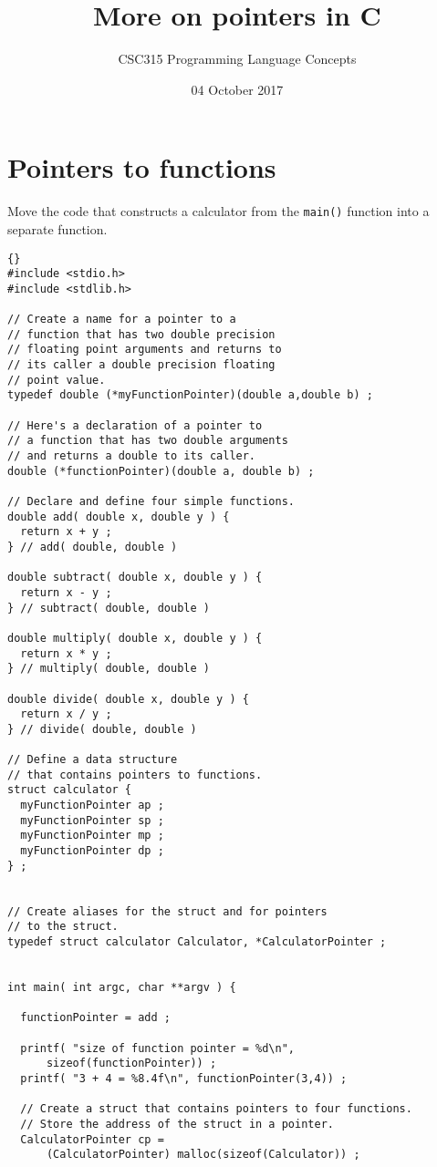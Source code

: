 \documentclass[twosides]{article}
\title{More on pointers in C}
\author{CSC315 Programming Language Concepts}
\date{04 October 2017}
\begin{document}
\maketitle

\section{Pointers to functions}

Move the code that constructs a calculator
from the \lstinline+main()+ function into
a separate function.

\begin{lstlisting}{}
#include <stdio.h>
#include <stdlib.h>

// Create a name for a pointer to a
// function that has two double precision
// floating point arguments and returns to
// its caller a double precision floating
// point value.
typedef double (*myFunctionPointer)(double a,double b) ;

// Here's a declaration of a pointer to
// a function that has two double arguments
// and returns a double to its caller.
double (*functionPointer)(double a, double b) ;

// Declare and define four simple functions.
double add( double x, double y ) {
  return x + y ;
} // add( double, double )

double subtract( double x, double y ) {
  return x - y ;
} // subtract( double, double )

double multiply( double x, double y ) {
  return x * y ;
} // multiply( double, double )

double divide( double x, double y ) {
  return x / y ;
} // divide( double, double )

// Define a data structure
// that contains pointers to functions.
struct calculator {
  myFunctionPointer ap ;
  myFunctionPointer sp ;
  myFunctionPointer mp ;
  myFunctionPointer dp ;
} ;


// Create aliases for the struct and for pointers
// to the struct.
typedef struct calculator Calculator, *CalculatorPointer ;


int main( int argc, char **argv ) {

  functionPointer = add ;

  printf( "size of function pointer = %d\n",
      sizeof(functionPointer)) ;
  printf( "3 + 4 = %8.4f\n", functionPointer(3,4)) ;

  // Create a struct that contains pointers to four functions.
  // Store the address of the struct in a pointer.
  CalculatorPointer cp =
      (CalculatorPointer) malloc(sizeof(Calculator)) ;


\end{lstlisting}
\end{document}
